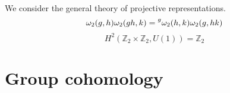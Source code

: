 \documentclass[hyperref, a4paper]{article}
\begin{document}
We consider the general theory of projective representations.
\begin{equation}
    \omega_2(g, h) \omega_2(gh, k) = \prescript{g}{}{\omega_2(h, k)} \omega_2(g, hk)
\end{equation}
\begin{equation}
    H^2(\mathbb{Z}_2 \times \mathbb{Z}_2, U(1)) = \mathbb{Z}_2
\end{equation}

\section{Group cohomology}


 
\end{document}

